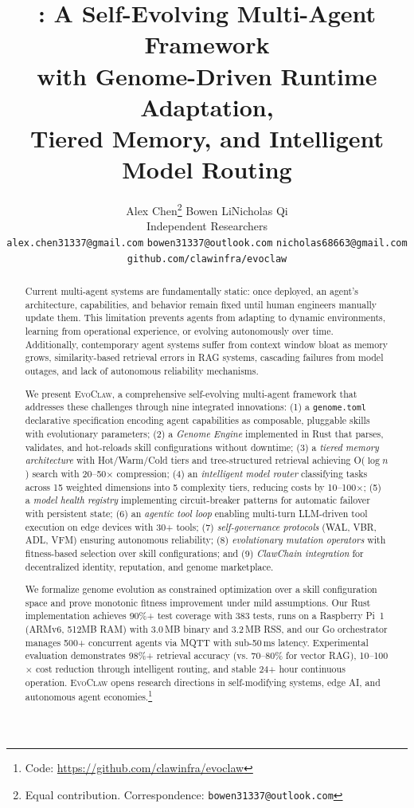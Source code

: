 \documentclass{article}
\title{\evoclaw{}: A Self-Evolving Multi-Agent Framework \\with Genome-Driven Runtime Adaptation, \\Tiered Memory, and Intelligent Model Routing}
\author{
  Alex Chen\thanks{Equal contribution. Correspondence: \texttt{bowen31337@outlook.com}} \quad Bowen Li\footnotemark[1] \quad Nicholas Qi\footnotemark[1] \\[0.3em]
  Independent Researchers \\
  \texttt{alex.chen31337@gmail.com} \quad \texttt{bowen31337@outlook.com} \quad \texttt{nicholas68663@gmail.com} \\
  \texttt{github.com/clawinfra/evoclaw}
}
\newcommand{\evoclaw}{\textsc{EvoClaw}}
\newcommand{\genome}{\texttt{genome.toml}}
\begin{document}
\maketitle

\begin{abstract}
Current multi-agent systems are fundamentally static: once deployed, an agent's architecture, capabilities, and behavior remain fixed until human engineers manually update them. This limitation prevents agents from adapting to dynamic environments, learning from operational experience, or evolving autonomously over time. Additionally, contemporary agent systems suffer from context window bloat as memory grows, similarity-based retrieval errors in RAG systems, cascading failures from model outages, and lack of autonomous reliability mechanisms.

We present \evoclaw{}, a comprehensive self-evolving multi-agent framework that addresses these challenges through nine integrated innovations: (1) a \genome{} declarative specification encoding agent capabilities as composable, pluggable skills with evolutionary parameters; (2) a \textit{Genome Engine} implemented in Rust that parses, validates, and hot-reloads skill configurations without downtime; (3) a \textit{tiered memory architecture} with Hot/Warm/Cold tiers and tree-structured retrieval achieving O($\log n$) search with 20--50$\times$ compression; (4) an \textit{intelligent model router} classifying tasks across 15 weighted dimensions into 5 complexity tiers, reducing costs by 10--100$\times$; (5) a \textit{model health registry} implementing circuit-breaker patterns for automatic failover with persistent state; (6) an \textit{agentic tool loop} enabling multi-turn LLM-driven tool execution on edge devices with 30+ tools; (7) \textit{self-governance protocols} (WAL, VBR, ADL, VFM) ensuring autonomous reliability; (8) \textit{evolutionary mutation operators} with fitness-based selection over skill configurations; and (9) \textit{ClawChain integration} for decentralized identity, reputation, and genome marketplace.

We formalize genome evolution as constrained optimization over a skill configuration space and prove monotonic fitness improvement under mild assumptions. Our Rust implementation achieves 90\%+ test coverage with 383 tests, runs on a Raspberry Pi~1 (ARMv6, 512MB RAM) with 3.0\,MB binary and 3.2\,MB RSS, and our Go orchestrator manages 500+ concurrent agents via MQTT with sub-50\,ms latency. Experimental evaluation demonstrates 98\%+ retrieval accuracy (vs. 70--80\% for vector RAG), 10--100$\times$ cost reduction through intelligent routing, and stable 24+ hour continuous operation. \evoclaw{} opens research directions in self-modifying systems, edge AI, and autonomous agent economies.\footnote{Code: \url{https://github.com/clawinfra/evoclaw}}
\end{abstract}
\end{document}
